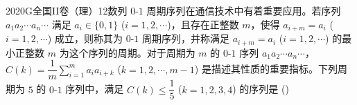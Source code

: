 
\begin{problem}{2020}{G}{全国II卷（理）}{12}{数列}
$ 0 $-$ 1 $ 周期序列在通信技术中有着重要应用。若序列 $ a_1 a_2 \cdots a_n \cdots $ 满足 $ a_i \in \{0,1\} $ ($ i=1,2,\cdots $)，且存在正整数 $ m $，使得 $ a_{i+m} = a_i $ ($ i=1,2,\cdots $) 成立，则称其为 $ 0 $-$ 1 $ 周期序列，并称满足 $ a_{i+m} = a_i $ ($ i=1,2,\cdots $) 的最小正整数 $ m $ 为这个序列的周期。对于周期为 $ m $ 的 $ 0 $-$ 1 $ 序列 $ a_1 a_2 \cdots a_n \cdots $，$ C(k) = \dfrac{1}{m} \displaystyle\sum_{i=1}^{m} a_i a_{i+k} $ ($ k=1,2,\cdots,m-1 $) 是描述其性质的重要指标。下列周期为 $ 5 $ 的 $ 0 $-$ 1 $ 序列中，满足 $ C(k) \leqslant \dfrac{1}{5} $ ($ k=1,2,3,4 $) 的序列是 (\hspace{1cm})
\begin{choices}
\choice{{$11010\cdots$}}
\choice{{$11011\cdots$}}
\choice{{$10001\cdots$}}
\choice{{$11001\cdots$}}
\end{choices}
\end{problem}

\begin{answer}

\end{answer}

\begin{solutions}

\end{solutions}